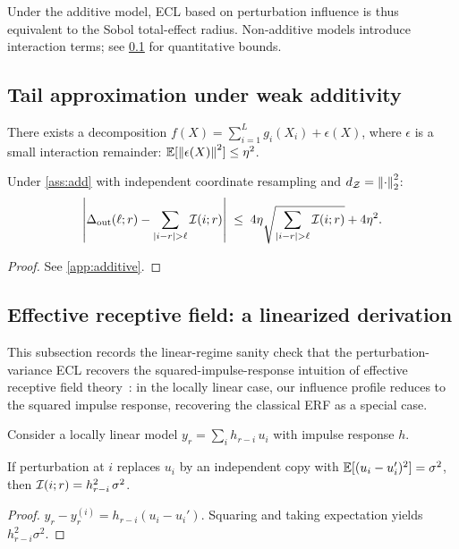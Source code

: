 Under the additive model, ECL based on perturbation influence is thus equivalent to the Sobol total-effect radius. Non-additive models introduce interaction terms; see \cref{sec:interaction_ecl_theory} for quantitative bounds.

\subsection{Tail approximation under weak additivity}\label{sec:interaction_ecl_theory}

\begin{assumption}\label{ass:add}
There exists a decomposition $f(X) = \sum_{i=1}^L g_i(X_i) + \epsilon(X)$, where $\epsilon$ is a small interaction remainder: $\mathbb{E}[\left\lVert \epsilon(X) \right\rVert^2] \le \eta^2$.
\end{assumption}

\begin{proposition}\label{prop:tail_add}
Under \cref{ass:add} with independent coordinate resampling and $d_{\mathcal{Z}} = \left\lVert \cdot \right\rVert_2^2$:
\[
\left|\Delta_{\mathrm{out}}(\ell;r) - \sum_{|i-r|>\ell}\cI(i;r)\right| \;\le\; 4\eta\sqrt{\sum_{|i-r|>\ell}\cI(i;r)} + 4\eta^2.
\]
\end{proposition}
\begin{proof}
See \cref{app:additive}.
\end{proof}

\subsection{Effective receptive field: a linearized derivation}\label{sec:erf}

This subsection records the linear-regime sanity check that the perturbation-variance ECL recovers the squared-impulse-response intuition of effective receptive field theory~\citep{Luo2016EffectiveRF}: in the locally linear case, our influence profile reduces to the squared impulse response, recovering the classical ERF as a special case.

Consider a locally linear model $y_r = \sum_i h_{r-i}\, u_i$ with impulse response $h$.

\begin{proposition}\label{prop:linear_influence}
If perturbation at $i$ replaces $u_i$ by an independent copy with $\mathbb{E}[(u_i-u_i')^2]=\sigma^2$, then $\mathcal{I}(i;r) = h_{r-i}^2\, \sigma^2$.
\end{proposition}
\begin{proof}
$y_r-y_r^{(i)} = h_{r-i}(u_i-u_i')$. Squaring and taking expectation yields $h_{r-i}^2\sigma^2$.
\end{proof}

